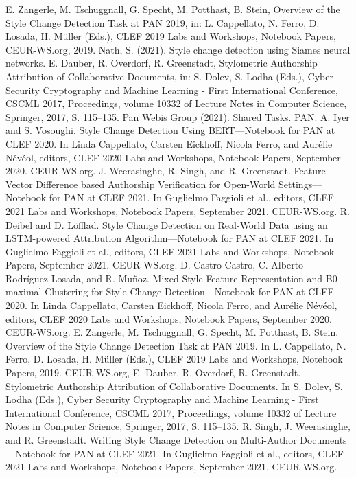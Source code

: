 \documentclass[conference]{IEEEtran}
\begin{document}
\begin{thebibliography}{00}
 E. Zangerle, M. Tschuggnall, G. Specht, M. Potthast, B. Stein, Overview of the Style Change Detection Task at PAN 2019, in: L. Cappellato, N. Ferro, D. Losada, H. Müller (Eds.), CLEF 2019 Labs and Workshops, Notebook Papers, CEUR-WS.org, 2019.
 Nath, S. (2021).  Style change detection using Siames neural networks.
 E. Dauber, R. Overdorf, R. Greenstadt, Stylometric Authorship Attribution of Collaborative Documents, in: S. Dolev, S. Lodha (Eds.), Cyber Security Cryptography and Machine Learning - First International Conference, CSCML 2017, Proceedings, volume 10332 of Lecture Notes in Computer Science, Springer, 2017, S. 115–135.
 Pan Webis Group (2021). Shared Tasks. PAN.
 A. Iyer and S. Vosoughi. Style Change Detection Using BERT—Notebook for PAN at CLEF 2020. In Linda Cappellato, Carsten Eickhoff, Nicola Ferro, and Aurélie Névéol, editors, CLEF 2020 Labs and Workshops, Notebook Papers, September 2020. CEUR-WS.org.
 J. Weerasinghe, R. Singh, and R. Greenstadt. Feature Vector Difference based Authorship Verification for Open-World Settings—Notebook for PAN at CLEF 2021. In Guglielmo Faggioli et al., editors, CLEF 2021 Labs and Workshops, Notebook Papers, September 2021. CEUR-WS.org.
 R. Deibel and D. Löfflad. Style Change Detection on Real-World Data using an LSTM-powered Attribution Algorithm—Notebook for PAN at CLEF 2021. In Guglielmo Faggioli et al., editors, CLEF 2021 Labs and Workshops, Notebook Papers, September 2021. CEUR-WS.org.
 D. Castro-Castro, C. Alberto Rodríguez-Losada, and R. Muñoz. Mixed Style Feature Representation and B0-maximal Clustering for Style Change Detection—Notebook for PAN at CLEF 2020. In Linda Cappellato, Carsten Eickhoff, Nicola Ferro, and Aurélie Névéol, editors, CLEF 2020 Labs and Workshops, Notebook Papers, September 2020. CEUR-WS.org.
 E. Zangerle, M. Tschuggnall, G. Specht, M. Potthast, B. Stein. Overview of the Style Change Detection Task at PAN 2019. In L. Cappellato, N. Ferro, D. Losada, H. Müller (Eds.), CLEF 2019 Labs and Workshops, Notebook Papers, 2019. CEUR-WS.org,
 E. Dauber, R. Overdorf, R. Greenstadt. Stylometric Authorship Attribution of Collaborative Documents. In S. Dolev, S. Lodha (Eds.), Cyber Security Cryptography and Machine Learning - First International Conference, CSCML 2017, Proceedings, volume 10332 of Lecture Notes in Computer Science, Springer, 2017, S. 115–135.
 R. Singh, J. Weerasinghe, and R. Greenstadt. Writing Style Change Detection on Multi-Author Documents—Notebook for PAN at CLEF 2021. In Guglielmo Faggioli et al., editors, CLEF 2021 Labs and Workshops, Notebook Papers, September 2021. CEUR-WS.org.

\end{thebibliography}
\end{document}
